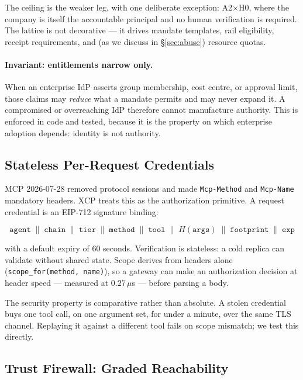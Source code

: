 \documentclass[11pt]{article}
\begin{document}
The ceiling is the weaker leg, with one deliberate exception: A2$\times$H0, where
the company is itself the accountable principal and no human verification is
required. The lattice is not decorative --- it drives mandate templates, rail
eligibility, receipt requirements, and (as we discuss in \S\ref{sec:abuse})
resource quotas.

\paragraph{Invariant: entitlements narrow only.}
When an enterprise IdP asserts group membership, cost centre, or approval limit,
those claims may \emph{reduce} what a mandate permits and may never expand it. A
compromised or overreaching IdP therefore cannot manufacture authority. This is
enforced in code and tested, because it is the property on which enterprise
adoption depends: identity is not authority.

\subsection{Stateless Per-Request Credentials}\label{sec:stateless}

MCP 2026-07-28 removed protocol sessions and made \texttt{Mcp-Method} and
\texttt{Mcp-Name} mandatory headers. XCP treats this as the authorization
primitive. A request credential is an EIP-712 signature binding:

\[
\texttt{agent} \;\|\; \texttt{chain} \;\|\; \texttt{tier} \;\|\;
\texttt{method} \;\|\; \texttt{tool} \;\|\; H(\texttt{args}) \;\|\;
\texttt{footprint} \;\|\; \texttt{exp}
\]

with a default expiry of 60 seconds. Verification is stateless: a cold replica
can validate without shared state. Scope derives from headers alone
(\texttt{scope\_for(method, name)}), so a gateway can make an authorization
decision at header speed --- measured at $0.27\,\mu$s --- before parsing a body.

The security property is comparative rather than absolute. A stolen credential
buys one tool call, on one argument set, for under a minute, over the same TLS
channel. Replaying it against a different tool fails on scope mismatch; we test
this directly.

\subsection{Trust Firewall: Graded Reachability}\label{sec:firewall}
\end{document}
